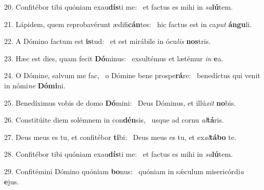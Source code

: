 20. Confitébor tibi quóniam exau\textbf{dís}ti me: \ast\  et factus es mihi in \textit{sa}\textbf{lú}tem.\

21. Lápidem, quem reprobavérunt ædifi\textbf{cán}tes: \ast\  hic factus est in ca\textit{put} \textbf{án}\textbf{gu}li.\

22. A Dómino factum est \textbf{is}tud: \ast\  et est mirábile in ócu\textit{lis} \textbf{nos}tris.\

23. Hæc est dies, quam fecit \textbf{Dó}minus: \ast\  exsultémus et lætémur \textit{in} \textbf{e}a.\

24. O Dómine, salvum me fac, \dag\  o Dómine bene prospe\textbf{rá}re: \ast\  benedíctus qui venit in nómi\textit{ne} \textbf{Dó}\textbf{mi}ni.\

25. Benedíximus vobis de domo \textbf{Dó}mini: \ast\  Deus Dóminus, et illú\textit{xit} \textbf{no}bis.\

26. Constitúite diem solémnem in con\textbf{dén}sis, \ast\  usque ad cornu \textit{al}\textbf{tá}ris.\

27. Deus meus es tu, et confitébor \textbf{ti}bi: \ast\  Deus meus es tu, et ex\textit{al}\textbf{tá}\textbf{bo} te.\

28. Confitébor tibi quóniam exau\textbf{dís}ti me: \ast\  et factus es mihi in \textit{sa}\textbf{lú}tem.\

29. Confitémini Dómino quóniam \textbf{bo}nus: \ast\  quóniam in sǽculum misericórdi\textit{a} \textbf{e}jus.\

